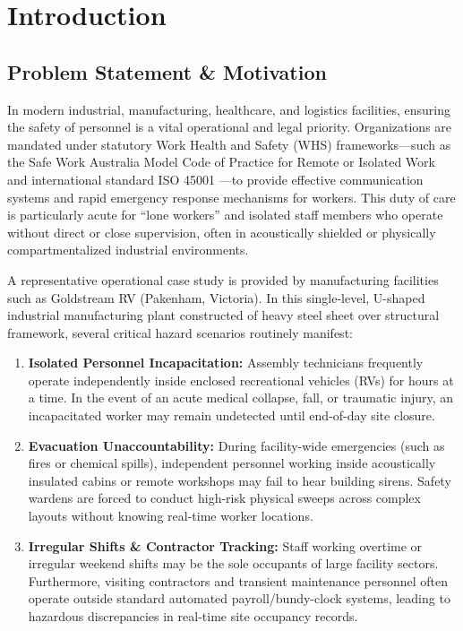 \chapter{Introduction}
\label{chap:introduction}

\section{Problem Statement \& Motivation}
In modern industrial, manufacturing, healthcare, and logistics facilities, ensuring the safety of personnel is a vital operational and legal priority. Organizations are mandated under statutory Work Health and Safety (WHS) frameworks---such as the Safe Work Australia Model Code of Practice for Remote or Isolated Work \cite{safework2020} and international standard ISO 45001 \cite{iso45001}---to provide effective communication systems and rapid emergency response mechanisms for workers. This duty of care is particularly acute for ``lone workers'' and isolated staff members who operate without direct or close supervision, often in acoustically shielded or physically compartmentalized industrial environments.

A representative operational case study is provided by manufacturing facilities such as Goldstream RV (Pakenham, Victoria). In this single-level, U-shaped industrial manufacturing plant constructed of heavy steel sheet over structural framework, several critical hazard scenarios routinely manifest:
\begin{enumerate}
    \item \textbf{Isolated Personnel Incapacitation:} Assembly technicians frequently operate independently inside enclosed recreational vehicles (RVs) for hours at a time. In the event of an acute medical collapse, fall, or traumatic injury, an incapacitated worker may remain undetected until end-of-day site closure.
    \item \textbf{Evacuation Unaccountability:} During facility-wide emergencies (such as fires or chemical spills), independent personnel working inside acoustically insulated cabins or remote workshops may fail to hear building sirens. Safety wardens are forced to conduct high-risk physical sweeps across complex layouts without knowing real-time worker locations.
    \item \textbf{Irregular Shifts \& Contractor Tracking:} Staff working overtime or irregular weekend shifts may be the sole occupants of large facility sectors. Furthermore, visiting contractors and transient maintenance personnel often operate outside standard automated payroll/bundy-clock systems, leading to hazardous discrepancies in real-time site occupancy records.
\end{enumerate}

